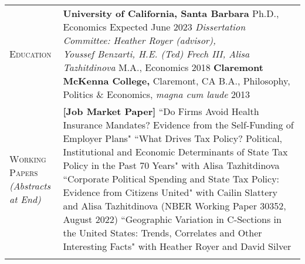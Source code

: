 \documentclass[11pt]{article}
\begin{document}
\begin{tabularx}{\textwidth}{@{}Y Z@{}}
	
	\textsc{Education} &
	\textbf{University of California, Santa Barbara}
	\vspace{3pt} \newline
	\hspace*{15pt} Ph.D., Economics \hfill Expected June 2023%
	\vspace{3pt} \newline
	\hspace*{15pt} \textit{Dissertation Committee: Heather Royer (advisor), \newline \hspace*{15pt} Youssef Benzarti, H.E. (Ted) Frech III, Alisa Tazhitdinova} 
	\vspace{3pt} \newline
	\hspace*{15pt} M.A., Economics \hfill 2018%
	\vspace{10pt} \newline
	\textbf{Claremont McKenna College,} Claremont, CA 
	\vspace{3pt} \newline
	\hspace*{15pt} B.A., Philosophy, Politics \& Economics, \textit{magna cum laude} \hfill 2013%
    \\  \addlinespace[20pt] 

	\textsc{Working \newline Papers} \vspace{5pt} \newline \textit{(Abstracts \newline at End)} & 
	 \textbf{[Job Market Paper]} ``Do Firms Avoid Health Insurance Mandates? \newline Evidence from the Self-Funding of Employer Plans"
	\vspace{10pt} \newline
	``What Drives Tax Policy? Political, Institutional and Economic Determinants \newline of State Tax Policy in the Past 70 Years" with Alisa Tazhitdinova 
	\vspace{10pt} \newline
	``Corporate Political Spending and State Tax Policy: Evidence from Citizens United" \newline with Cailin Slattery and Alisa Tazhitdinova (NBER Working Paper 30352, August 2022)
	\vspace{10pt} \newline
	``Geographic Variation in C-Sections in the United States: Trends, Correlates \newline and Other Interesting Facts" with Heather Royer and David Silver 
     \\ \addlinespace[10pt] 
    

\end{tabularx}
\end{document}

